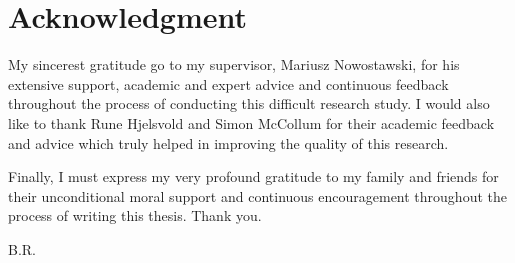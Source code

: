 \chapter*{Acknowledgment}

My sincerest gratitude go to my supervisor, Mariusz Nowostawski, for his extensive support, academic and expert advice and continuous feedback throughout the process of conducting this difficult research study. I would also like to thank Rune Hjelsvold and Simon McCollum for their academic feedback and advice which truly helped in improving the quality of this research.

Finally, I must express my very profound gratitude to my family and friends for their unconditional moral support and continuous encouragement throughout the process of writing this thesis. Thank you.


\begin{flushright}
B.R.\\[1pc]
\end{flushright}